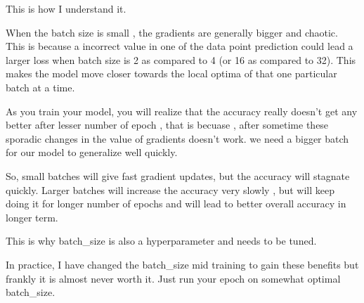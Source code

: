 \documentclass[12pt]{article}
\begin{document}
\begin{itemize}
This is how I understand it.

    When the batch size is small , the gradients are generally bigger and chaotic. This is because a incorrect value in one of the data point prediction could lead a larger loss when batch size is 2 as compared to 4 (or 16 as compared to 32). This makes the model move closer towards the local optima of that one particular batch at a time.

    As you train your model, you will realize that the accuracy really doesn't get any better after lesser number of epoch , that is becuase , after sometime these sporadic changes in the value of gradients doesn't work. we need a bigger batch for our model to generalize well quickly.

So, small batches will give fast gradient updates, but the accuracy will stagnate quickly. Larger batches will increase the accuracy very slowly , but will keep doing it for longer number of epochs and will lead to better overall accuracy in longer term.

This is why batch_size is also a hyperparameter and needs to be tuned.

In practice, I have changed the batch_size mid training to gain these benefits but frankly it is almost never worth it. Just run your epoch on somewhat optimal batch_size.


\end{itemize}
\end{document}
